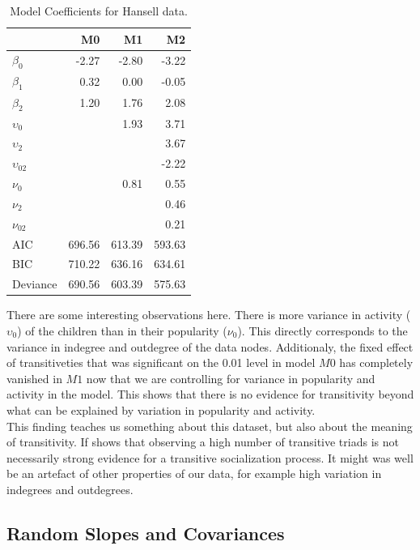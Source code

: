 \documentclass[a4paper]{article}
\begin{document}
\begin{table}[ht]
\begin{center}
\begin{tabular}{lrrr}
  \hline
 & M0 & M1 & M2 \\ 
  \hline
$\beta_0$ & -2.27 & -2.80 & -3.22 \\ 
  $\beta_1$ & 0.32 & 0.00 & -0.05 \\ 
  $\beta_2$ & 1.20 & 1.76 & 2.08 \\ 
   \hline
$\upsilon_0$ &  & 1.93 & 3.71 \\ 
  $\upsilon_2$ &  &  & 3.67 \\ 
  $\upsilon_{02}$ &  &  & -2.22 \\ 
  $\nu_0$ &  & 0.81 & 0.55 \\ 
  $\nu_2$ &  &  & 0.46 \\ 
  $\nu_{02}$ &  &  & 0.21 \\ 
   \hline
AIC & 696.56 & 613.39 & 593.63 \\ 
  BIC & 710.22 & 636.16 & 634.61 \\ 
  Deviance & 690.56 & 603.39 & 575.63 \\ 
   \hline
\end{tabular}
\caption{Model Coefficients for Hansell data.}
\label{hansellcoef}
\end{center}
\end{table}
There are some interesting observations here. There is more variance in activity ($\upsilon_0$) of the children than in
their popularity ($\nu_0$). This directly corresponds to the variance in indegree and outdegree of the data nodes.
Additionaly, the fixed effect of transitiveties that was significant on the 0.01 level in model $M0$ has completely vanished 
in $M1$ now that we are controlling for variance in popularity and activity in the model. This shows that there is no 
evidence for transitivity beyond what can be explained by variation in popularity and activity. \\

This finding teaches us something about this dataset, but also about the meaning of transitivity. If shows that observing 
a high number of transitive triads is not necessarily strong evidence for a transitive socialization process. It might was well be an 
artefact of other properties of our data, for example high variation in indegrees and outdegrees. \\

\subsection{Random Slopes and Covariances}
\end{document}

